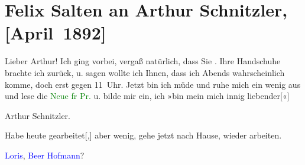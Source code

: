 

\renewcommand{\erwaehntePersonen}{Personen: Richard Beer-Hofmann, Hugo von Hofmannsthal, Johann Schnitzler}
\renewcommand{\erwaehnteOrte}{Orte: Burgring, Ordination Dr. Arthur Schnitzler, Wien}
\renewcommand{\erwaehnteWerke}{Werke: Neue Freie Presse}
\section[Felix Salten an Arthur Schnitzler, {[}April 1892{]}]{Felix Salten an Arthur Schnitzler, {[}April 1892{]}}
\nopagebreak{}
\rehead{ }\normalsize\beginnumbering{}
\toendnotes[C]{\smallbreak\pagebreak[2]}
\toendnotes[C]{\smallbreak}
\pstart
           \noindent{}{\pb}Lieber Arthur! Ich ging vorbei, vergaß natürlich, dass
               Sie \label{K_L03184-1v}\label{K_L03184-1h}. Ihre Handschuhe brachte ich zurück, u. sagen wollte ich Ihnen, dass ich
                  Abends wahrscheinlich komme, doch erst gegen 11 Uhr.
               Jetzt bin ich müde und ruhe mich {\pb}ein wenig aus und lese die
                  \textcolor{green}{Neue fr Pr.}{}\ledrightnote{\textcolor{green}{Neue Freie Presse}} u. bilde mir ein, ich »bin mein
               mich innig liebender{[}«{]}\pend
           
\pstart
           \centering{}Arthur Schnitzler.\pend
           
\pstart
           \noindent{}Habe heute gearbeitet{[},{]} aber wenig, gehe jetzt nach
               Hause, wieder arbeiten.\pend
           
\pstart
           \textcolor{blue}{Loris}{}\ledrightnote{\textcolor{blue}{Hugo von Hofmannsthal}}, \textcolor{blue}{Beer
                  Hofmann}{}\ledrightnote{\textcolor{blue}{Richard Beer-Hofmann}}?\pend
           \endnumbering{}  
      